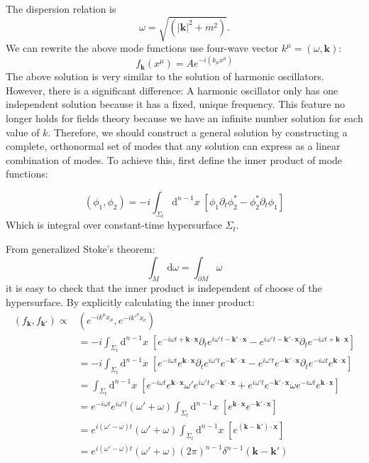\documentclass[12pt]{article}
\numberwithin{equation}{subsection}
\theoremstyle{mystyle}{\newtheorem{definition}{Definition}[subsection]}
\theoremstyle{mystyle}{\newtheorem{theorem}[definition]{Theorem}}
\theoremstyle{mystyle}{\newtheorem*{remark}{Remark}}
\theoremstyle{mystyle}{\newtheorem{example}{Example}[subsection]}
\theoremstyle{mystyle}{\newtheorem{examples}{Examples}[subsection]}
\theoremstyle{mystyle}{\newtheorem{cthm}{}[subsection]}
\newcommand{\p}{\partial}
\newcommand{\id}{\mathrm{d}}
\begin{document}
The dispersion relation is \[\omega = \sqrt{(\mathbf{|k|}^2 + m^2 )}.\]
We can rewrite the above mode functions use four-wave vector \(k^{\mu}=(\omega,\mathbf{k})\):
\begin{equation}\label{112}
  f_{\mathbf{k}}(x^{\mu})= Ae^{-i(k_\mu x^\mu)}
\end{equation}
The above solution is very similar to the solution of harmonic oscillators. However, there is a significant difference:
A harmonic oscillator only has one independent solution because it has a fixed, unique frequency.
This feature no longer holds for fields theory because we have an infinite number solution for each value of \(k\).
Therefore, we should construct a general solution by constructing a complete, orthonormal set of modes that any solution
can express as a linear combination of modes.
To achieve this, first define the inner product of mode functions:
\begin{definition}\label{kgi}
  \[(\phi_1,\phi_2)=-i\int_{\Sigma_t}\id^{n-1}x\;\left[\phi_1\p_t\phi^*_2-\phi_2^*\p_t\phi_1\right]\]
  Which is integral over constant-time hypersurface \(\Sigma_t\).
\end{definition}
From generalized Stoke's theorem:\[\int_{M}\id\omega=\int_{\p M}\omega\]
\hfill \break
it is easy to check that the inner product is independent of choose of the hypersurface.
By explicitly calculating the inner product:
\begin{align}
  \left(f_{\mathbf{k}},f_{\mathbf{k}'}\right)\propto
   & \left(e^{-ik^{\mu}x_{\mu}},e^{-ik'^{\nu}x_{\nu}}\right)                           \\
   & =-i\int_{\Sigma_t}\id^{n-1}x\;\left[e^{-i\omega t+\mathbf{k}\cdot\mathbf{x}}
  \p_{t}e^{i\omega' t-\mathbf{k'}\cdot\mathbf{x}}-e^{i\omega' t-\mathbf{k'}\cdot\mathbf{x}}
  \p_{t}e^{-i\omega t+\mathbf{k}\cdot\mathbf{x}}\right]                                \\
   & = -i\int_{\Sigma_t}\id^{n-1}x\;\left[e^{-i\omega t} e^{\mathbf{k}\cdot\mathbf{x}}
  \p_{t}e^{i\omega' t}e^{-\mathbf{k'}\cdot\mathbf{x}}-e^{i\omega' t}e^{-\mathbf{k'}\cdot\mathbf{x}}
  \p_{t}e^{-i\omega t}e^{\mathbf{k}\cdot\mathbf{x}}\right]                             \\
   & =\int_{\Sigma_t}\id^{n-1}x\;\left[e^{-i\omega t} e^{\mathbf{k}\cdot\mathbf{x}}
  \omega' e^{i\omega' t}e^{-\mathbf{k'}\cdot\mathbf{x}}+e^{i\omega' t}e^{-\mathbf{k'}\cdot\mathbf{x}}
  \omega e^{-i\omega t}e^{\mathbf{k}\cdot\mathbf{x}}\right]                            \\
   & =  e^{-i\omega t}e^{i\omega' t}(\omega'+\omega)\int_{\Sigma_t}\id^{n-1}x\;
  \left[ e^{\mathbf{k}\cdot\mathbf{x}}e^{-\mathbf{k'}\cdot\mathbf{x}}\right]           \\
   & =   e^{i(\omega'-\omega)t}(\omega'+\omega)\int_{\Sigma_t}\id^{n-1}x\;
  \left[ e^{(\mathbf{k}-\mathbf{k'})\cdot\mathbf{x}}\right]                            \\
   & =  e^{i(\omega'-\omega)t}(\omega'+\omega)(2\pi)^{n-1}
  \delta^{n-1}\left(\mathbf{k}-\mathbf{k'}\right)
\end{align}
\end{document}
